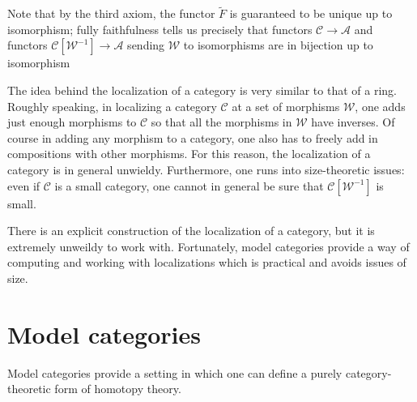 \documentclass[main.tex]{subfiles}
\begin{document}
Note that by the third axiom, the functor $\tilde{F}$ is guaranteed to be unique up to isomorphism; fully faithfulness tells us precisely that functors $\mathcal{C} \to \mathcal{A}$ and functors $\mathcal{C}[\mathcal{W}^{-1}] \to \mathcal{A}$ sending $\mathcal{W}$ to isomorphisms are in bijection up to isomorphism

The idea behind the localization of a category is very similar to that of a ring. Roughly speaking, in localizing a category $\mathcal{C}$ at a set of morphisms $\mathcal{W}$, one adds just enough morphisms to $\mathcal{C}$ so that all the morphisms in $\mathcal{W}$ have inverses. Of course in adding any morphism to a category, one also has to freely add in compositions with other morphisms. For this reason, the localization of a category is in general unwieldy. Furthermore, one runs into size-theoretic issues: even if $\mathcal{C}$ is a small category, one cannot in general be sure that $\mathcal{C}[\mathcal{W}^{-1}]$ is small.

There is an explicit construction of the localization of a category, but it is extremely unweildy to work with. Fortunately, model categories provide a way of computing and working with localizations which is practical and avoids issues of size.

\section{Model categories}
\label{sec:model_categories}

Model categories provide a setting in which one can define a purely category-theoretic form of homotopy theory.
\end{document}
